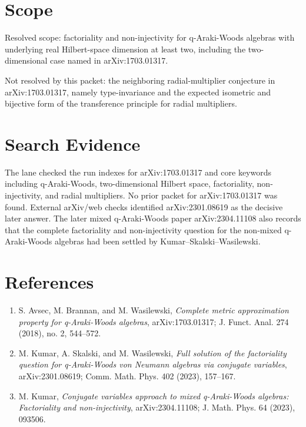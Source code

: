 \documentclass[11pt]{article}
\begin{document}
\section*{Scope}

Resolved scope: factoriality and non-injectivity for q-Araki-Woods algebras
with underlying real Hilbert-space dimension at least two, including the
two-dimensional case named in arXiv:1703.01317.

Not resolved by this packet: the neighboring radial-multiplier conjecture in
arXiv:1703.01317, namely type-invariance and the expected isometric and
bijective form of the transference principle for radial multipliers.

\section*{Search Evidence}

The lane checked the run indexes for arXiv:1703.01317 and core keywords
including q-Araki-Woods, two-dimensional Hilbert space, factoriality,
non-injectivity, and radial multipliers. No prior packet for arXiv:1703.01317
was found. External arXiv/web checks identified arXiv:2301.08619 as the
decisive later answer. The later mixed q-Araki-Woods paper arXiv:2304.11108
also records that the complete factoriality and non-injectivity question for
the non-mixed q-Araki-Woods algebras had been settled by
Kumar--Skalski--Wasilewski.

\section*{References}

\begin{enumerate}
\item S. Avsec, M. Brannan, and M. Wasilewski,
\emph{Complete metric approximation property for q-Araki-Woods algebras},
arXiv:1703.01317; J. Funct. Anal. 274 (2018), no. 2, 544--572.
\item M. Kumar, A. Skalski, and M. Wasilewski,
\emph{Full solution of the factoriality question for q-Araki-Woods von
Neumann algebras via conjugate variables}, arXiv:2301.08619; Comm. Math.
Phys. 402 (2023), 157--167.
\item M. Kumar,
\emph{Conjugate variables approach to mixed q-Araki-Woods algebras:
Factoriality and non-injectivity}, arXiv:2304.11108; J. Math. Phys. 64
(2023), 093506.
\end{enumerate}
\end{document}

